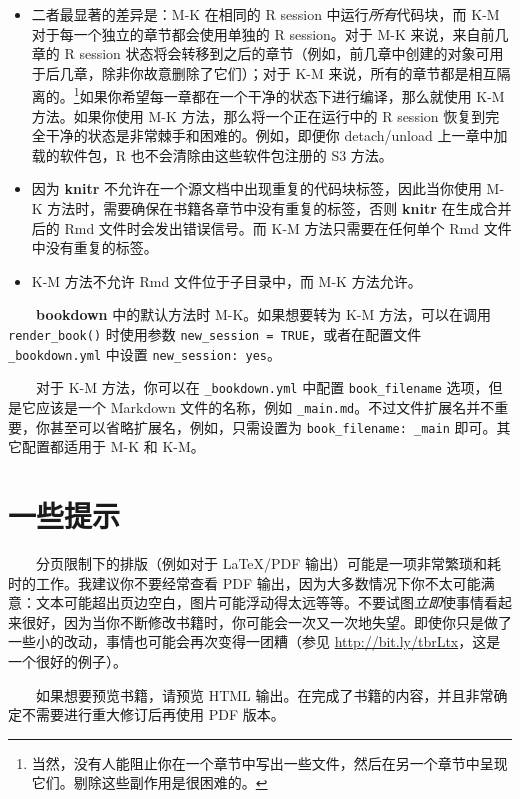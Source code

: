 \documentclass[
  12pt,
]{krantz}
\providecommand{\tightlist}{%
  \setlength{\itemsep}{0pt}\setlength{\parskip}{0pt}}
\theoremstyle{definition}
\theoremstyle{definition}
\theoremstyle{definition}
\theoremstyle{definition}
\theoremstyle{remark}
\begin{document}
\begin{itemize}
\tightlist
\item
  二者最显著的差异是：M-K 在相同的 R session 中运行\emph{所有}代码块，而 K-M 对于每一个独立的章节都会使用单独的 R session。对于 M-K 来说，来自前几章的 R session 状态将会转移到之后的章节（例如，前几章中创建的对象可用于后几章，除非你故意删除了它们）；对于 K-M 来说，所有的章节都是相互隔离的。\footnote{当然，没有人能阻止你在一个章节中写出一些文件，然后在另一个章节中呈现它们。剔除这些副作用是很困难的。}如果你希望每一章都在一个干净的状态下进行编译，那么就使用 K-M 方法。如果你使用 M-K 方法，那么将一个正在运行中的 R session 恢复到完全干净的状态是非常棘手和困难的。例如，即便你 detach/unload 上一章中加载的软件包，R 也不会清除由这些软件包注册的 S3 方法。
\item
  因为 \textbf{knitr} 不允许在一个源文档中出现重复的代码块标签，因此当你使用 M-K 方法时，需要确保在书籍各章节中没有重复的标签，否则 \textbf{knitr} 在生成合并后的 Rmd 文件时会发出错误信号。而 K-M 方法只需要在任何单个 Rmd 文件中没有重复的标签。
\item
  K-M 方法不允许 Rmd 文件位于子目录中，而 M-K 方法允许。
\end{itemize}

  \textbf{bookdown} 中的默认方法时 M-K。如果想要转为 K-M 方法，可以在调用 \texttt{render\_book()} 时使用参数 \texttt{new\_session\ =\ TRUE}，或者在配置文件 \texttt{\_bookdown.yml} 中设置 \texttt{new\_session:\ yes}。

  对于 K-M 方法，你可以在 \texttt{\_bookdown.yml} 中配置 \texttt{book\_filename} 选项，但是它应该是一个 Markdown 文件的名称，例如 \texttt{\_main.md}。不过文件扩展名并不重要，你甚至可以省略扩展名，例如，只需设置为 \texttt{book\_filename:\ \_main} 即可。其它配置都适用于 M-K 和 K-M。

\hypertarget{ux4e00ux4e9bux63d0ux793a}{%
\section{一些提示}\label{ux4e00ux4e9bux63d0ux793a}}

  分页限制下的排版（例如对于 LaTeX/PDF 输出）可能是一项非常繁琐和耗时的工作。我建议你不要经常查看 PDF 输出，因为大多数情况下你不太可能满意：文本可能超出页边空白，图片可能浮动得太远等等。不要试图\emph{立即}使事情看起来很好，因为当你不断修改书籍时，你可能会一次又一次地失望。即使你只是做了一些小的改动，事情也可能会再次变得一团糟（参见 \url{http://bit.ly/tbrLtx}，这是一个很好的例子）。

  如果想要预览书籍，请预览 HTML 输出。在完成了书籍的内容，并且非常确定不需要进行重大修订后再使用 PDF 版本。
\end{document}

